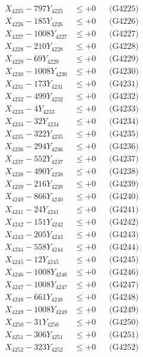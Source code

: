 \documentclass[a4paper,10pt]{article}
\begin{document}
{\begin{align}
X_{4225} - 797Y_{4225} &\leq +0 && \text{(G4225)} \\
X_{4226} - 185Y_{4226} &\leq +0 && \text{(G4226)} \\
X_{4227} - 1008Y_{4227} &\leq +0 && \text{(G4227)} \\
X_{4228} - 210Y_{4228} &\leq +0 && \text{(G4228)} \\
X_{4229} - 69Y_{4229} &\leq +0 && \text{(G4229)} \\
X_{4230} - 1008Y_{4230} &\leq +0 && \text{(G4230)} \\
\allowbreak
X_{4231} - 173Y_{4231} &\leq +0 && \text{(G4231)} \\
X_{4232} - 499Y_{4232} &\leq +0 && \text{(G4232)} \\
X_{4233} - 4Y_{4233} &\leq +0 && \text{(G4233)} \\
X_{4234} - 32Y_{4234} &\leq +0 && \text{(G4234)} \\
X_{4235} - 322Y_{4235} &\leq +0 && \text{(G4235)} \\
X_{4236} - 294Y_{4236} &\leq +0 && \text{(G4236)} \\
X_{4237} - 552Y_{4237} &\leq +0 && \text{(G4237)} \\
X_{4238} - 490Y_{4238} &\leq +0 && \text{(G4238)} \\
X_{4239} - 216Y_{4239} &\leq +0 && \text{(G4239)} \\
X_{4240} - 866Y_{4240} &\leq +0 && \text{(G4240)} \\
\allowbreak
X_{4241} - 24Y_{4241} &\leq +0 && \text{(G4241)} \\
X_{4242} - 151Y_{4242} &\leq +0 && \text{(G4242)} \\
X_{4243} - 205Y_{4243} &\leq +0 && \text{(G4243)} \\
X_{4244} - 558Y_{4244} &\leq +0 && \text{(G4244)} \\
X_{4245} - 12Y_{4245} &\leq +0 && \text{(G4245)} \\
X_{4246} - 1008Y_{4246} &\leq +0 && \text{(G4246)} \\
X_{4247} - 1008Y_{4247} &\leq +0 && \text{(G4247)} \\
X_{4248} - 661Y_{4248} &\leq +0 && \text{(G4248)} \\
X_{4249} - 1008Y_{4249} &\leq +0 && \text{(G4249)} \\
X_{4250} - 31Y_{4250} &\leq +0 && \text{(G4250)} \\
\allowbreak
X_{4251} - 306Y_{4251} &\leq +0 && \text{(G4251)} \\
X_{4252} - 323Y_{4252} &\leq +0 && \text{(G4252)} \\

\end{align}}
\end{document}
